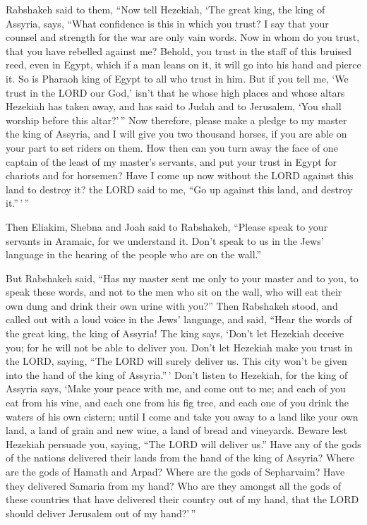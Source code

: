  Rabshakeh said to them, ``Now tell Hezekiah, `The great
king, the king of Assyria, says, ``What confidence is this in which you
trust?  I say that your counsel and strength for the war are
only vain words. Now in whom do you trust, that you have rebelled
against me?  Behold, you trust in the staff of this bruised
reed, even in Egypt, which if a man leans on it, it will go into his
hand and pierce it. So is Pharaoh king of Egypt to all who trust in him.
 But if you tell me, `We trust in the LORD our God,' isn't
that he whose high places and whose altars Hezekiah has taken away, and
has said to Judah and to Jerusalem, `You shall worship before this
altar?'\,''  Now therefore, please make a pledge to my
master the king of Assyria, and I will give you two thousand horses, if
you are able on your part to set riders on them.  How then
can you turn away the face of one captain of the least of my master's
servants, and put your trust in Egypt for chariots and for horsemen?
 Have I come up now without the LORD against this land to
destroy it? the LORD said to me, ``Go up against this land, and destroy
it.''\,'\,''

 Then Eliakim, Shebna and Joah said to Rabshakeh, ``Please
speak to your servants in Aramaic, for we understand it. Don't speak to
us in the Jews' language in the hearing of the people who are on the
wall.''

 But Rabshakeh said, ``Has my master sent me only to your
master and to you, to speak these words, and not to the men who sit on
the wall, who will eat their own dung and drink their own urine with
you?''  Then Rabshakeh stood, and called out with a loud
voice in the Jews' language, and said, ``Hear the words of the great
king, the king of Assyria!  The king says, `Don't let
Hezekiah deceive you; for he will not be able to deliver you.
 Don't let Hezekiah make you trust in the LORD, saying,
``The LORD will surely deliver us. This city won't be given into the
hand of the king of Assyria.''\,'  Don't listen to
Hezekiah, for the king of Assyria says, `Make your peace with me, and
come out to me; and each of you eat from his vine, and each one from his
fig tree, and each one of you drink the waters of his own cistern;
 until I come and take you away to a land like your own
land, a land of grain and new wine, a land of bread and vineyards.
 Beware lest Hezekiah persuade you, saying, ``The LORD will
deliver us.'' Have any of the gods of the nations delivered their lands
from the hand of the king of Assyria?  Where are the gods
of Hamath and Arpad? Where are the gods of Sepharvaim? Have they
delivered Samaria from my hand?  Who are they amongst all
the gods of these countries that have delivered their country out of my
hand, that the LORD should deliver Jerusalem out of my hand?'\,''

